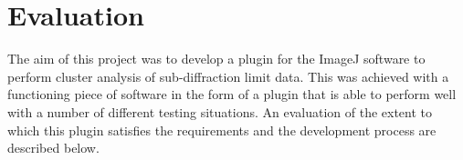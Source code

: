 
\chapter{Evaluation}
\label{prt:evaluation}

The aim of this project was to develop a plugin for the ImageJ software to
perform cluster analysis of sub-diffraction limit data. This was achieved with
a functioning piece of software in the form of a plugin that is able to perform
well with a number of different testing situations. An evaluation of the extent
to which this plugin satisfies the requirements and the development process are
described below.
